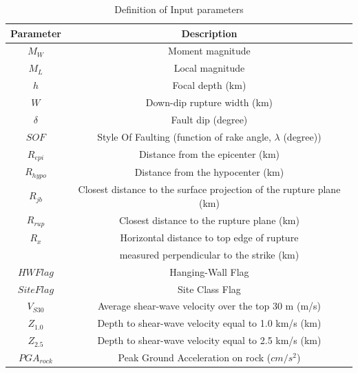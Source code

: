 \begin{table}[!t]
\renewcommand{\arraystretch}{1.3}
\caption{Definition of Input parameters} \label{def} \centering
\begin{tabular}{|c|c|}
\hline Parameter& Description\\
\hline $M_W$ & {\small Moment magnitude}\\

\hline $M_L$ & {\small Local magnitude}\\

\hline $h$ & {\small Focal depth (km)}\\

\hline $W$ & {\small Down-dip rupture width (km)}\\

\hline $\delta$ & {\small Fault dip (degree)}\\

\hline $SOF$ & {\small Style Of Faulting (function of rake angle,
$\lambda$
(degree))}\\

\hline $R_{epi}$ & {\small Distance from the epicenter (km)}\\

\hline $R_{hypo}$ & {\small Distance from the hypocenter (km)}\\

\hline $R_{jb}$ & {\small Closest distance to the surface projection
of the
rupture plane (km)}\\

\hline $R_{rup}$ & {\small Closest distance to the rupture plane (km)}\\

\hline $R_x$ & {\small Horizontal distance to top edge of rupture}\\
 &{\small measured
perpendicular to the strike (km)}\\

\hline $HW Flag$ & {\small Hanging-Wall Flag}\\

\hline $Site Flag$ & {\small Site Class Flag}\\

\hline $V_{S30}$ & {\small Average shear-wave velocity over the top 30 m (m/s)}\\

\hline $Z_{1.0}$ & {\small Depth to shear-wave velocity equal to 1.0
km/s
(km)}\\

\hline $Z_{2.5}$ & {\small Depth to shear-wave velocity equal to 2.5
km/s
(km)}\\

\hline $PGA_{rock}$ &{\small Peak Ground Acceleration on rock ($cm/s^2$)}\\
\hline

\end{tabular}
\end{table}





